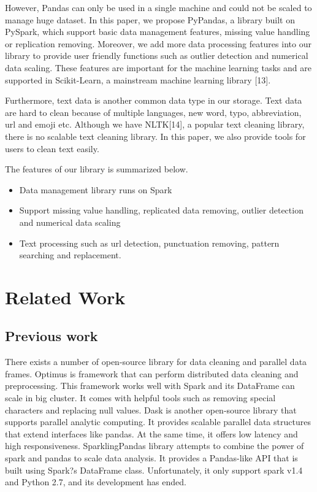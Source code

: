 \documentclass[sigconf]{acmart}
\begin{document}
	However, Pandas can only be used in a single machine and could not be scaled to manage huge dataset. In this paper, we propose PyPandas, a library built on PySpark, which support basic data management features, missing value handling or replication removing. Moreover, we add more data processing features into our library to provide user friendly functions such as outlier detection and numerical data scaling. These features are important for the machine learning tasks and are supported in Scikit-Learn, a mainstream machine learning library [13].
	
	Furthermore, text data is another common data type in our storage. Text data are hard to clean because of multiple languages, new word, typo, abbreviation, url and emoji etc. Although we have NLTK[14], a popular text cleaning library, there is no scalable text cleaning library. In this paper, we also provide tools for users to clean text easily. 
	
	The features of our library is summarized below.
	\begin{itemize}
		\item{Data management library runs on Spark}
		\item{Support missing value handling, replicated data removing, outlier detection and numerical data scaling}
		\item{Text processing such as url detection, punctuation removing, pattern searching and replacement. }
	\end{itemize}
	




\section{Related Work}
\subsection{Previous work}
There exists a number of open-source library for data cleaning and parallel data frames. Optimus is framework that can perform distributed data cleaning and preprocessing. This framework works well with Spark and its DataFrame can scale in big cluster. It comes with helpful tools such as removing special characters and replacing null values. Dask is another open-source library that supports parallel analytic computing. It provides scalable parallel data structures that extend interfaces like pandas. At the same time, it offers low latency and high responsiveness. SparklingPandas library attempts to combine the power of spark and pandas to scale data analysis. It provides a Pandas-like API that is built using Spark?s DataFrame class. Unfortunately, it only support spark v1.4 and Python 2.7, and its development has ended.
\end{document}
